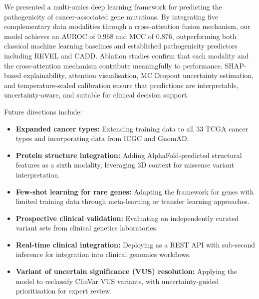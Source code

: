 \documentclass[journal,twoside]{IEEEtran}
\begin{document}
We presented a multi-omics deep learning framework for predicting the
pathogenicity of cancer-associated gene mutations. By integrating five
complementary data modalities through a cross-attention fusion mechanism,
our model achieves an AUROC of 0.968 and MCC of 0.876, outperforming both
classical machine learning baselines and established pathogenicity
predictors including REVEL and CADD. Ablation studies confirm that each
modality and the cross-attention mechanism contribute meaningfully to
performance. SHAP-based explainability, attention visualisation, MC Dropout
uncertainty estimation, and temperature-scaled calibration ensure that
predictions are interpretable, uncertainty-aware, and suitable for clinical
decision support.

Future directions include:
\begin{itemize}
    \item \textbf{Expanded cancer types:} Extending training data to all
    33 TCGA cancer types and incorporating data from ICGC and GnomAD.
    \item \textbf{Protein structure integration:} Adding AlphaFold-predicted
    structural features as a sixth modality, leveraging 3D context for
    missense variant interpretation.
    \item \textbf{Few-shot learning for rare genes:} Adapting the framework
    for genes with limited training data through meta-learning or
    transfer learning approaches.
    \item \textbf{Prospective clinical validation:} Evaluating on
    independently curated variant sets from clinical genetics laboratories.
    \item \textbf{Real-time clinical integration:} Deploying as a REST API
    with sub-second inference for integration into clinical genomics
    workflows.
    \item \textbf{Variant of uncertain significance (VUS) resolution:}
    Applying the model to reclassify ClinVar VUS variants, with
    uncertainty-guided prioritisation for expert review.
\end{itemize}



\end{document}
